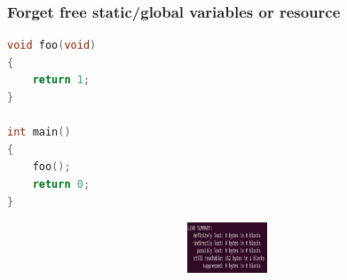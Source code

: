 \documentclass{bredelebeamer}
\begin{document}
\begin{frame}[fragile]
	\frametitle{Forget free static/global variables or resource}
	\begin{center}
		\begin{lstlisting}[language=C++]
void foo(void)
{
	return 1;
}

int main()
{
	foo();
	return 0;
}

		\end{lstlisting}
	\end{center}

	\begin{center}
		\begin{figure}
			\includegraphics[height=1.5cm,width=11cm]{forget_free_static2.png}
		\end{figure}
	\end{center}
\end{frame}

%
%
%
%
%
%
%
\end{document}
